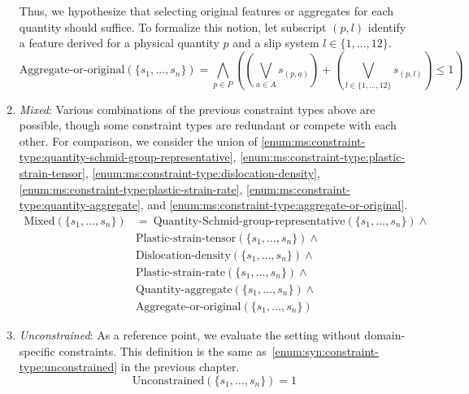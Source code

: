 \begin{enumerate}[label=(D\arabic*), wide]
	Thus, we hypothesize that selecting original features or aggregates for each quantity should suffice.
	To formalize this notion, let subscript $(p,l)$ identify a feature derived for a physical quantity $p$ and a slip system $l \in \{1, \dots, 12\}$.
	\begin{equation}
		\text{Aggregate-or-original}(\{s_1, \dots, s_n\}) = \bigwedge_{p \in P} \left( \left( \bigvee_{a \in A} s_{(p,a)} \right) + \left( \bigvee_{l \in \{1, \dots, 12\}} s_{(p,l)} \right) \leq 1 \right)
		\label{eq:ms:aggregate-or-original}
	\end{equation}
	\item\label{enum:ms:constraint-type:mixed} \emph{Mixed}:
	Various combinations of the previous constraint types above are possible, though some constraint types are redundant or compete with each other.
	For comparison, we consider the union of \ref{enum:ms:constraint-type:quantity-schmid-group-representative}, \ref{enum:ms:constraint-type:plastic-strain-tensor}, \ref{enum:ms:constraint-type:dislocation-density}, \ref{enum:ms:constraint-type:plastic-strain-rate}, \ref{enum:ms:constraint-type:quantity-aggregate}, and \ref{enum:ms:constraint-type:aggregate-or-original}.
	\begin{equation}
		\begin{aligned}
			\text{Mixed}(\{s_1, \dots, s_n\}) &=~\text{Quantity-Schmid-group-representative}(\{s_1, \dots, s_n\}) \land \\
			& \text{Plastic-strain-tensor}(\{s_1, \dots, s_n\}) \land \\
			& \text{Dislocation-density}(\{s_1, \dots, s_n\}) \land \\
			& \text{Plastic-strain-rate}(\{s_1, \dots, s_n\}) \land \\
			& \text{Quantity-aggregate}(\{s_1, \dots, s_n\}) \land \\
			& \text{Aggregate-or-original}(\{s_1, \dots, s_n\})
		\end{aligned}
		\label{eq:ms:constraint:mixed}
	\end{equation}
	\item\label{enum:ms:constraint-type:unconstrained} \emph{Unconstrained}:
	As a reference point, we evaluate the setting without domain-specific constraints.
	This definition is the same as~\ref{enum:syn:constraint-type:unconstrained} in the previous chapter.
	\begin{equation}
		\text{Unconstrained}(\{s_1, \dots, s_n\}) = 1
		\label{eq:ms:constraint:unconstrained}
	\end{equation}
\end{enumerate}

